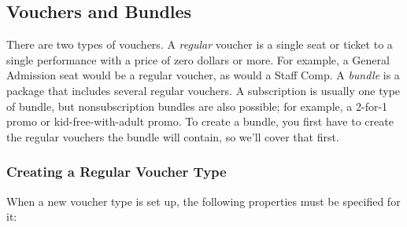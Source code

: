 \subsection{Vouchers and Bundles}
\label{sec:vouchertypes-details}

There are two types of vouchers.  A \emph{regular} voucher is a single
seat or ticket to a single performance with a price of zero dollars or
more.  For example, a General Admission seat would be a regular voucher,
as would a Staff Comp.  A \emph{bundle} is a package
that includes several regular vouchers.  A subscription is usually one
type of bundle, but nonsubscription bundles are also possible; for example,
a 2-for-1 promo or kid-free-with-adult promo.
To create a bundle, you first have to create the regular vouchers the
bundle will contain, so we'll cover that first.

\subsubsection{Creating a Regular Voucher Type}
\label{sec:addingregularvouchertypes}

When a new voucher type is set up, 
the following properties must be specified for it:

